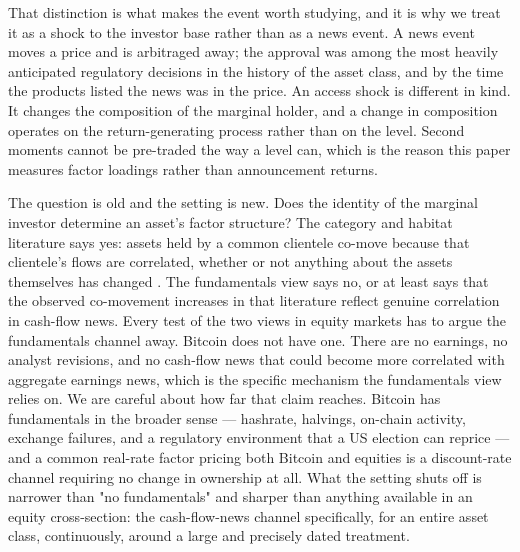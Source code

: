 \documentclass[12pt,a4paper]{article}
\begin{document}
That distinction is what makes the event worth studying, and it is why we treat it as a shock to the investor base rather than as a news event. A news event moves a price and is arbitraged away; the approval was among the most heavily anticipated regulatory decisions in the history of the asset class, and by the time the products listed the news was in the price. An access shock is different in kind. It changes the composition of the marginal holder, and a change in composition operates on the return-generating process rather than on the level. Second moments cannot be pre-traded the way a level can, which is the reason this paper measures factor loadings rather than announcement returns.

The question is old and the setting is new. Does the identity of the marginal investor determine an asset's factor structure? The category and habitat literature says yes: assets held by a common clientele co-move because that clientele's flows are correlated, whether or not anything about the assets themselves has changed \citep{barberis2003style,barberis2004comovement}. The fundamentals view says no, or at least says that the observed co-movement increases in that literature reflect genuine correlation in cash-flow news. Every test of the two views in equity markets has to argue the fundamentals channel away. Bitcoin does not have one. There are no earnings, no analyst revisions, and no cash-flow news that could become more correlated with aggregate earnings news, which is the specific mechanism the fundamentals view relies on. We are careful about how far that claim reaches. Bitcoin has fundamentals in the broader sense — hashrate, halvings, on-chain activity, exchange failures, and a regulatory environment that a US election can reprice — and a common real-rate factor pricing both Bitcoin and equities is a discount-rate channel requiring no change in ownership at all. What the setting shuts off is narrower than "no fundamentals" and sharper than anything available in an equity cross-section: the cash-flow-news channel specifically, for an entire asset class, continuously, around a large and precisely dated treatment.
\end{document}
